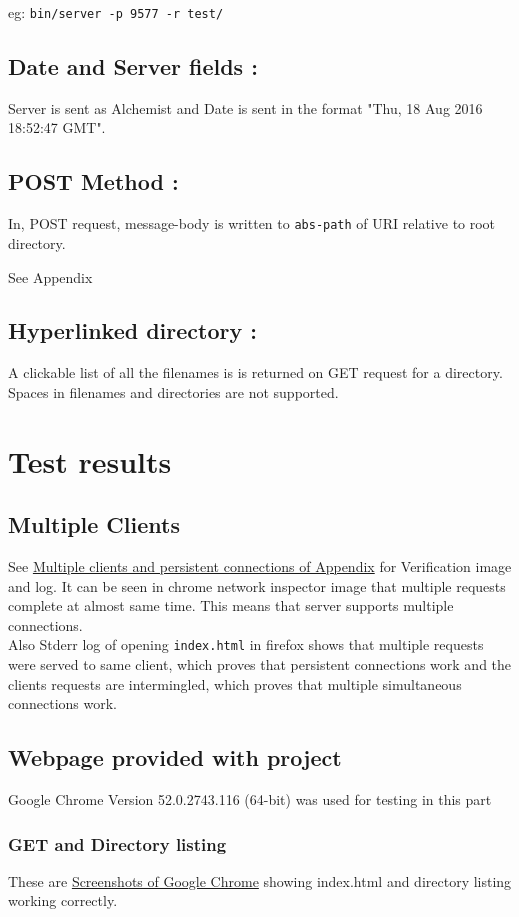 \documentclass[11pt]{article}
\begin{document}
\noindent eg: \texttt{bin/server -p 9577 -r test/}
\subsection{Date and Server fields :}
\label{sec:orgheadline5}
Server is sent as Alchemist and Date is sent in the format "Thu, 18 Aug 2016 18:52:47 GMT".
\subsection{POST Method :}
\label{sec:orgheadline6}
In, POST request, message-body is written to \texttt{abs-path} of URI relative to root directory.

\noindent See Appendix
\subsection{Hyperlinked directory :}
\label{sec:orgheadline7}
A clickable list of all the filenames is is returned on GET request for a directory. Spaces in filenames and directories are not supported.

\newpage
\section{Test results}
\label{sec:orgheadline24}
\subsection{Multiple Clients}
\label{sec:orgheadline10}
See \hyperref[sec:orgheadline9]{Multiple clients and persistent connections of Appendix} for Verification image and log.
It can be seen in chrome network inspector image that multiple requests complete at almost same time. This means that server supports multiple connections.  \\
Also Stderr log of opening \texttt{index.html} in firefox shows that multiple requests were served to same client, which proves that persistent 
connections work and the clients requests are intermingled, which proves that multiple simultaneous connections work.

\subsection{Webpage provided with project}
\label{sec:orgheadline14}
Google Chrome Version 52.0.2743.116 (64-bit) was used for testing in this part
\subsubsection{GET and Directory listing}
\label{sec:orgheadline12}
These are \hyperref[sec:orgheadline11]{Screenshots of Google Chrome} showing index.html and directory listing working correctly.
\end{document}
